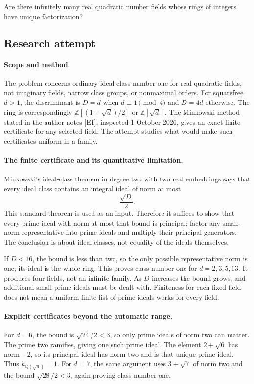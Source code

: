 \documentclass[11pt,a4paper]{article}
\begin{document}
Are there infinitely many real quadratic number fields whose rings of integers have unique factorization?

\subsection{Research attempt}

\paragraph{Scope and method.}
The problem concerns ordinary ideal class number one for real quadratic
fields, not imaginary fields, narrow class groups, or nonmaximal orders.
For squarefree $d>1$, the discriminant is $D=d$ when $d\equiv1\pmod4$
and $D=4d$ otherwise. The ring is correspondingly
$\mathbb Z[(1+\sqrt d)/2]$ or $\mathbb Z[\sqrt d]$.
The Minkowski method stated in the author notes [E1], inspected
1 October 2026, gives an exact finite certificate for any selected field.
The attempt studies what would make such certificates uniform in a family.

\paragraph{The finite certificate and its quantitative limitation.}
Minkowski's ideal-class theorem in degree two with two real embeddings
says that every ideal class contains an integral ideal of norm at most
\[
                              \frac{\sqrt D}{2}.
\]
This standard theorem is used as an input. Therefore it suffices to
show that every prime ideal with norm at most that bound is principal:
factor any small-norm representative into prime ideals and multiply
their principal generators. The conclusion is about ideal classes,
not equality of the ideals themselves.

If $D<16$, the bound is less than two, so the only possible representative
norm is one; its ideal is the whole ring. This proves class number one
for $d=2,3,5,13$. It produces four fields, not an infinite family.
As $D$ increases the bound grows, and additional small prime ideals
must be dealt with. Finiteness for each fixed field does not mean a
uniform finite list of prime ideals works for every field.

\paragraph{Explicit certificates beyond the automatic range.}
For $d=6$, the bound is $\sqrt{24}/2<3$, so only prime ideals of
norm two can matter. The prime two ramifies, giving one such prime
ideal. The element $2+\sqrt6$ has norm $-2$, so its principal ideal
has norm two and is that unique prime ideal. Thus $h_{\mathbb Q(\sqrt6)}=1$.
For $d=7$, the same argument uses $3+\sqrt7$ of norm two and the
bound $\sqrt{28}/2<3$, again proving class number one.
\end{document}
